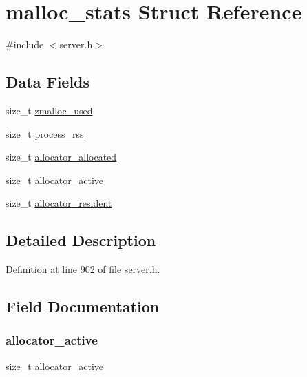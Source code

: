 \hypertarget{structmalloc__stats}{}\section{malloc\+\_\+stats Struct Reference}
\label{structmalloc__stats}


{\ttfamily \#include $<$server.\+h$>$}

\subsection*{Data Fields}
\begin{DoxyCompactItemize}
\item 
size\+\_\+t \hyperlink{structmalloc__stats_a24fe6607486bb69f2f446830dbf6c8fb}{zmalloc\+\_\+used}
\item 
size\+\_\+t \hyperlink{structmalloc__stats_a93e17e92b02c3ad2a4e6bf903154b3d2}{process\+\_\+rss}
\item 
size\+\_\+t \hyperlink{structmalloc__stats_a35a8adbf64bc20a4ab20cf3872ea5e54}{allocator\+\_\+allocated}
\item 
size\+\_\+t \hyperlink{structmalloc__stats_a78e452f18e74cbf8be28858f49c0ff0b}{allocator\+\_\+active}
\item 
size\+\_\+t \hyperlink{structmalloc__stats_abaf85ea7348d3c27fea44dcc7cebd639}{allocator\+\_\+resident}
\end{DoxyCompactItemize}


\subsection{Detailed Description}


Definition at line 902 of file server.\+h.



\subsection{Field Documentation}
\mbox{\label{structmalloc__stats_a78e452f18e74cbf8be28858f49c0ff0b}} 
\subsubsection{\texorpdfstring{allocator\+\_\+active}{allocator\_active}}
{\footnotesize\ttfamily size\+\_\+t allocator\+\_\+active}



